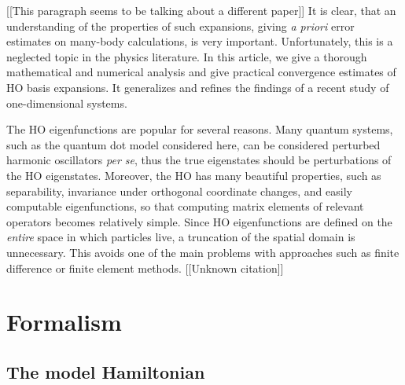 \documentclass[amsmath, amssymb, aps, floatfix, nofootinbib, preprintnumbers,showpacs, superscriptaddress, twocolumn]{revtex4-1}
\begin{document}
[[This paragraph seems to be talking about a different paper]]
It is clear, that an understanding of the properties of such expansions,
giving \emph{a priori} error estimates on many-body calculations, is very
important. Unfortunately, this is a neglected topic in the physics
literature. In this article, we give a thorough mathematical and numerical
analysis and give practical convergence estimates of HO basis expansions. It
generalizes and refines the findings of a recent study of one-dimensional
systems.\cite{Kvaal2007}

The HO eigenfunctions are popular for several reasons. Many quantum systems, such as the quantum dot model considered here, can be considered perturbed harmonic oscillators \textit{per se}, thus the true eigenstates should be perturbations of the HO eigenstates.  Moreover, the HO has many beautiful properties, such as separability, invariance under orthogonal coordinate changes, and easily computable eigenfunctions, so that computing matrix elements of relevant operators becomes relatively simple.  Since HO eigenfunctions are defined on the \emph{entire} space in which particles live, a truncation of the spatial domain is unnecessary.  This avoids one of the main problems with approaches such as finite difference or finite element methods.\cite{RamMohan2002} [[Unknown citation]]


\section{Formalism}
\label{sec:formalism}

\subsection{The model Hamiltonian}
\label{subsec:modelHamiltonian}
\end{document}
